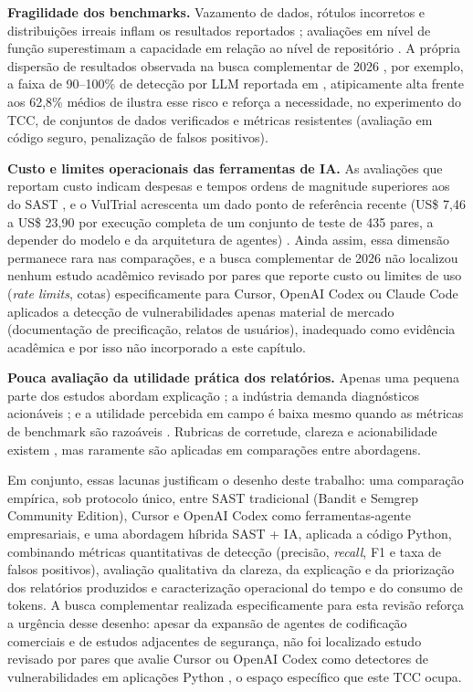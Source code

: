 \textbf{Fragilidade dos benchmarks.} Vazamento de dados, rótulos incorretos e distribuições irreais inflam os resultados reportados \cite{Ding2025CodeLMVuln, Chen2023DiverseVul, Chakraborty2022DLLimits}; avaliações em nível de função superestimam a capacidade em relação ao nível de repositório \cite{Wen2026VulEval}. A própria dispersão de resultados observada na busca complementar de 2026 , por exemplo, a faixa de 90–100\% de detecção por LLM reportada em \cite{Zhou2024SASTLLMRepo}, atipicamente alta frente aos 62,8\% médios de \cite{Khare2025LLMEffectiveness} ilustra esse risco e reforça a necessidade, no experimento do TCC, de conjuntos de dados verificados e métricas resistentes (avaliação em código seguro, penalização de falsos positivos).

\textbf{Custo e limites operacionais das ferramentas de IA.} As avaliações que reportam custo indicam despesas e tempos ordens de magnitude superiores aos do SAST \cite{Tamberg2025LLMHarness, Li2026ProjectScaleLLM}, e o VulTrial acrescenta um dado ponto de referência recente (US\$ 7,46 a US\$ 23,90 por execução completa de um conjunto de teste de 435 pares, a depender do modelo e da arquitetura de agentes) \cite{Widyasari2026VulTrial}. Ainda assim, essa dimensão permanece rara nas comparações, e a busca complementar de 2026 não localizou nenhum estudo acadêmico revisado por pares que reporte custo ou limites de uso (\textit{rate limits}, cotas) especificamente para Cursor, OpenAI Codex ou Claude Code aplicados a detecção de vulnerabilidades apenas material de mercado (documentação de precificação, relatos de usuários), inadequado como evidência acadêmica e por isso não incorporado a este capítulo.

\textbf{Pouca avaliação da utilidade prática dos relatórios.} Apenas uma pequena parte dos estudos abordam explicação \cite{Germano2025LLMSLR}; a indústria demanda diagnósticos acionáveis \cite{Li2025IndustrySAST}; e a utilidade percebida em campo é baixa mesmo quando as métricas de benchmark são razoáveis \cite{Steenhoek2025IDEUserStudy}. Rubricas de corretude, clareza e acionabilidade existem \cite{Mao2025ExplainableVD}, mas raramente são aplicadas em comparações entre abordagens.

Em conjunto, essas lacunas justificam o desenho deste trabalho: uma comparação empírica, sob protocolo único, entre SAST tradicional (Bandit e Semgrep Community Edition), Cursor e OpenAI Codex como ferramentas-agente empresariais, e uma abordagem híbrida SAST + IA, aplicada a código Python, combinando métricas quantitativas de detecção (precisão, \textit{recall}, F1 e taxa de falsos positivos), avaliação qualitativa da clareza, da explicação e da priorização dos relatórios produzidos e caracterização operacional do tempo e do consumo de tokens. A busca complementar realizada especificamente para esta revisão reforça a urgência desse desenho: apesar da expansão de agentes de codificação comerciais e de estudos adjacentes de segurança, não foi localizado estudo revisado por pares que avalie Cursor ou OpenAI Codex como detectores de vulnerabilidades em aplicações Python , o espaço específico que este TCC ocupa.
